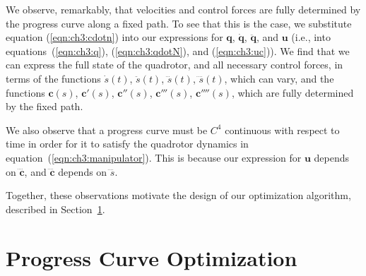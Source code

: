 We observe, remarkably, that velocities and control forces are fully determined by the progress curve along a fixed path.
To see that this is the case, we substitute equation (\ref{eqn:ch3:cdotn}) into our expressions for $\mathbf{q}$, $\dot{\mathbf{q}}$, $\ddot{\mathbf{q}}$, and $\mathbf{u}$ (i.e., into equations~(\ref{eqn:ch3:q}), (\ref{eqn:ch3:qdotN}), and (\ref{eqn:ch3:uc})).
We find that we can express the full state of the quadrotor, and all necessary control forces, in terms of the functions  $\dot{s}(t)$, $\ddot{s}(t)$, $\dddot{s}(t)$, $\ddddot{s}(t)$, which can vary, and the functions $\mathbf{c}(s)$, $\mathbf{c}'(s)$, $\mathbf{c}''(s)$, $\mathbf{c}'''(s)$, $\mathbf{c}''''(s)$, which are fully determined by the fixed path.

We also observe that a progress curve must be $C^4$ continuous with respect to time in order for it to satisfy the quadrotor dynamics in equation~(\ref{eqn:ch3:manipulator}).
This is because our expression for $\mathbf{u}$ depends on $\ddddot{\mathbf{c}}$, and $\ddddot{\mathbf{c}}$ depends on $\ddddot{s}$.

Together, these observations motivate the design of our optimization algorithm, described in Section~\ref{sec:ch3:optimization}.



\section{Progress Curve Optimization}
\label{sec:ch3:optimization}

